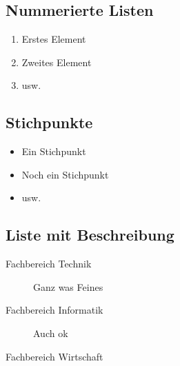 \subsection{Nummerierte Listen}
\begin{enumerate}
	\item Erstes Element
	\item Zweites Element
	\item usw.
\end{enumerate}

\subsection{Stichpunkte}
\begin{itemize}
	\item Ein Stichpunkt
	\item Noch ein Stichpunkt
	\item usw.
\end{itemize}

\subsection{Liste mit Beschreibung}
\begin{description}
	\item[Fachbereich Technik] Ganz was Feines
	\item[Fachbereich Informatik] Auch ok
	\item[Fachbereich Wirtschaft] \blindtext
\end{description}
